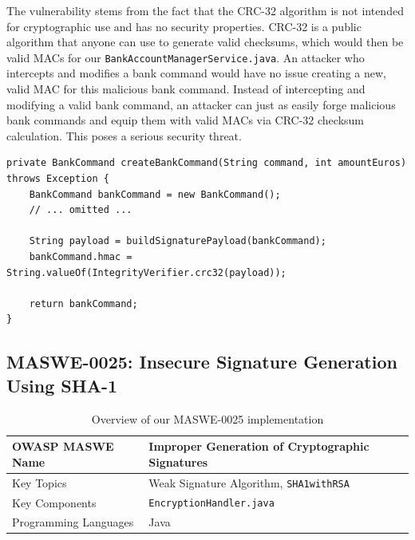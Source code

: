 The vulnerability stems from the fact that the CRC-32 algorithm is not intended for cryptographic use and has no security properties. CRC-32 is a public algorithm that anyone can use to generate valid checksums, which would then be valid MACs for our \texttt{BankAccountManagerService.java}. An attacker who intercepts and modifies a bank command would have no issue creating a new, valid MAC for this malicious bank command. Instead of intercepting and modifying a valid bank command, an attacker can just as easily forge malicious bank commands and equip them with valid MACs via CRC-32 checksum calculation. This poses a serious security threat.

\begin{lstlisting}[style=JavaStyle, float=tbh, captionpos=b, caption={Using CRC-32 checksum as MAC}, label={lst:Maswe0024Crc32AsMac}]
private BankCommand createBankCommand(String command, int amountEuros) throws Exception {
    BankCommand bankCommand = new BankCommand();
    // ... omitted ...

    String payload = buildSignaturePayload(bankCommand);
    bankCommand.hmac = String.valueOf(IntegrityVerifier.crc32(payload));

    return bankCommand;
}
\end{lstlisting}


\subsection{MASWE-0025: Insecure Signature Generation Using SHA-1}
\label{subsec:maswe-0025}

\vspace{-30pt}

\begin{table}[H]
    \centering
    \renewcommand{\arraystretch}{1.3}
        \begin{tabular}{p{5cm} p{8cm}} 
        \toprule
        OWASP MASWE Name & Improper Generation of Cryptographic Signatures \\ 
        \midrule
        Key Topics & Weak Signature Algorithm, \texttt{SHA1withRSA} \\
        Key Components & \texttt{EncryptionHandler.java} \\
        Programming Languages & Java \\ 
        \bottomrule
        \end{tabular}
    \caption{Overview of our MASWE-0025 implementation}
    \label{tab:maswe-0025}
\end{table}

